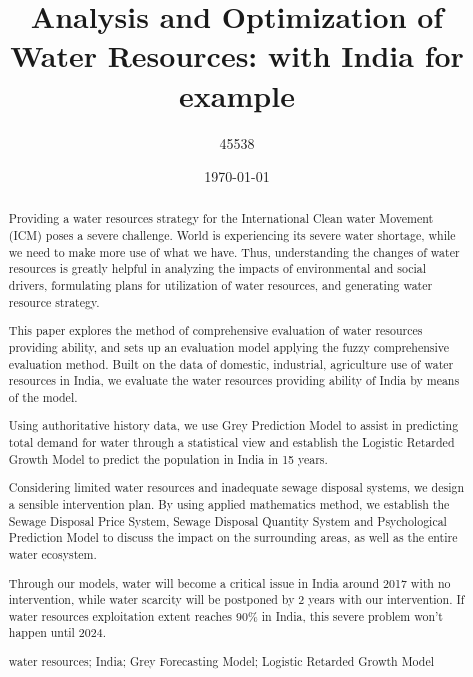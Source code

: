 \documentclass[tcn = 45538, sheet = true, abstract = true]{mcmthesis}
\title{Analysis and Optimization of Water Resources: with India for example}
\author{45538}
\date{\today}
\begin{document}
\begin{titlepage}
\begin{abstract}

Providing a water resources strategy for the International Clean water Movement 
(ICM) 
poses a severe challenge. 
World is experiencing its severe water shortage, 
while we need to make more use of what we have.
Thus, 
understanding the changes of water resources is greatly helpful 
in analyzing the impacts of environmental and social drivers, 
formulating plans for utilization of water resources,
and generating water resource strategy.

This paper explores the method of comprehensive evaluation of water resources providing ability, 
and sets up an evaluation model applying the fuzzy comprehensive evaluation method. 
Built on the data of domestic, industrial, agriculture use of water resources in India, 
we evaluate the water resources providing ability of India by means of the model. 

Using authoritative history data, 
we use Grey Prediction Model to assist in predicting total demand for water through a statistical view
and establish the Logistic Retarded Growth Model to predict the population in India in 15 years.

Considering limited water resources and inadequate sewage disposal systems, 
we design a sensible intervention plan. 
By using applied mathematics method, 
we establish the Sewage Disposal Price System, 
Sewage Disposal Quantity System and Psychological Prediction Model to discuss the impact on the surrounding areas, 
as well as the entire water ecosystem.

Through our models, 
water will become a critical issue in India around 2017 with no intervention, 
while water scarcity will be postponed by 2 years with our intervention. 
If water resources exploitation extent reaches 90\% in India, 
this severe problem won't happen until 2024.

\begin{keywords}
water resources; 
India; 
Grey Forecasting Model; 
Logistic Retarded Growth Model
\end{keywords}

\end{abstract}

\maketitle
\end{titlepage}
\newpage
\end{document}
